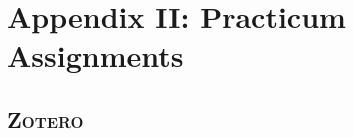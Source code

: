 \documentclass{tufte-handout} %
\begin{document}
\begin{comment}
2. _If you studied Arabic before_, your task will be to provide Arabic equivalents and their proper transliteration to the annotated data that everybody will be working on. We can discuss more challenging options.

#### Building Digital Maps ####

This is a complex task that involves working with multiple sources that come in different formats and different digital tools that help us create necessary data sets and visualize them. The main goal of this section is to get acquainted with the basic concepts of data formats (tabulated format, CSV, KML), data  manipulation (conversion from one format to another with Python scripts), and data visualization (using Google Earth). This task will involve:

1. Geo-referencing of existing historical paper maps (Cornu's Atlas: places, routes and canals), using ArcGIS.

2. Converting created data set into KML format for visualization with Google Earth (can be displayed online), using Python scripts for re-formatting data (scripts will be provided).

3.

#### Final Project: Thematic Maps ####

\end{comment}

\newpage
\section{Appendix II: Practicum Assignments}

\subsection{\textsc{Zotero}}
\end{document}
